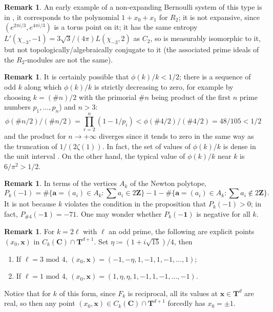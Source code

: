 \documentclass[12pt,reqno]{amsart}
\theoremstyle{definition}
\theoremstyle{plain}
\theoremstyle{definition}
\newtheorem{remark}[theorem]{Remark}
\newcommand{\Z}{\mathbf{Z}}
\newcommand{\Cc}{\mathbf{C}}
\newcommand{\T}{\mathbf{T}}
\begin{document}
\begin{remark}
An early example of a non-expanding Bernoulli system of this type is in \cite{Ward-dots}, it corresponds to the polynomial $1+x_0+x_1$ for $R_2$; it is not expansive, since $(e^{2 \pi i/3}, e^{4 \pi i/3})$ is a torus point on it; it has the same entropy $L'(\chi_{-3},-1) = 3 \sqrt{3}/(4\pi) L(\chi_{-3},2)$ as $C_2$, so is measurably isomorphic to it, but not topologically/algebraically conjugate to it (the associated prime ideals of the $R_2$-modules are not the same). 
\end{remark} 


\begin{remark} \label{remprimorial} 
It is certainly possible that $\phi(k)/k<1/2$; there is a sequence of odd $k$ along which $\phi(k)/k$ is strictly decreasing to zero, for example by choosing $k=(\#n)/2$ with the primorial $\#n$ being product of the first $n$ prime numbers $p_1,\dots,p_n$) and $n>3$: 
$$\phi(\#n/2)/(\#n/2) = \prod_{r=2}^n (1 - 1/p_i) < \phi(\#4/2)/(\#4/2) = 48/105 < 1/2$$ and the product for $n \rightarrow + \infty$ diverges since it tends to zero in the same way as the truncation of $1/(2\zeta(1)).$ In fact, the set of values of $\phi(k)/k$ is dense in the unit interval \cite[p.~31]{Ribenboim}. On the other hand, the typical value of $\phi(k)/k$ near $k$ is $6/\pi^2>1/2$. 
\end{remark} 

\begin{remark} 
In terms of the vertices $A_k$ of the Newton polytope, $$P_k(-1) = \#\{ \mathbf a = (a_i) \in A_k \colon \sum a_i \in 2\Z\} - 1 - \#\{ \mathbf a = (a_i) \in A_k \colon \sum a_i \notin 2\Z\}.$$  It is not because $k$ violates the condition in the proposition that $P_k(-1)>0$; in fact, $P_{\#4}(-\mathbf 1)=-71.$ One may wonder whether $P_k(-\mathbf 1)$ is negative for all $k$. 
\end{remark} 

\begin{remark} 
For $k=2\ell$ with $\ell$ an odd prime, the following are explicit points $(x_0,\mathbf x)$ in $C_k(\Cc) \cap \T^{d+1}$. Set $\eta\coloneqq (1+i \sqrt{15})/4$, then 
\begin{enumerate}
\item If $\ell = 3 \mbox{ mod } 4$, $(x_0,\mathbf x)=(-1,-\eta, 1, -1, 1, -1, \dots, 1)$;
\item If $\ell = 1 \mbox{ mod } 4$, $(x_0,\mathbf x)=(1,\eta,\eta, 1, -1, 1, -1, \dots, -1)$.
\end{enumerate} 
Notice that for $k$ of this form, since $F_k$ is reciprocal, all its values at $\mathbf x \in \T^d$ are real, so then any point $(x_0,\mathbf x) \in C_k(\Cc) \cap \T^{d+1}$ forcedly has $x_0 = \pm 1$.  
\end{remark} 
\end{document}
